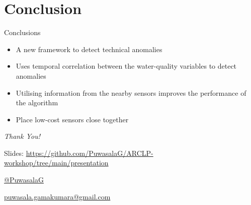 \documentclass[14pt,ignorenonframetext,compress]{beamer}
\begin{document}
\hypertarget{conclusion}{%
\section{Conclusion}\label{conclusion}}

\begin{frame}{Conclusions}
\protect\hypertarget{conclusions}{}
\begin{itemize}
\item
  A new framework to detect technical anomalies
\item
  Uses temporal correlation between the water-quality variables to
  detect anomalies
\item
  Utilising information from the nearby sensors improves the performance
  of the algorithm
\item
  Place low-cost sensors close together
\end{itemize}
\end{frame}

\begin{frame}
\begin{center}
\Huge \emph{Thank You!}
\end{center}

\begin{block}{}
Slides: \textcolor{blue}{\url{https://github.com/PuwasalaG/ARCLP-workshop/tree/main/presentation}}
\vspace*{1cm}

\href{https://github.com/PuwasalaG}{  @PuwasalaG}

\href{mailto:puwasala.gamakumara@gmail.com}{  puwasala.gamakumara@gmail.com}
\end{block}
\end{frame}
\end{document}
